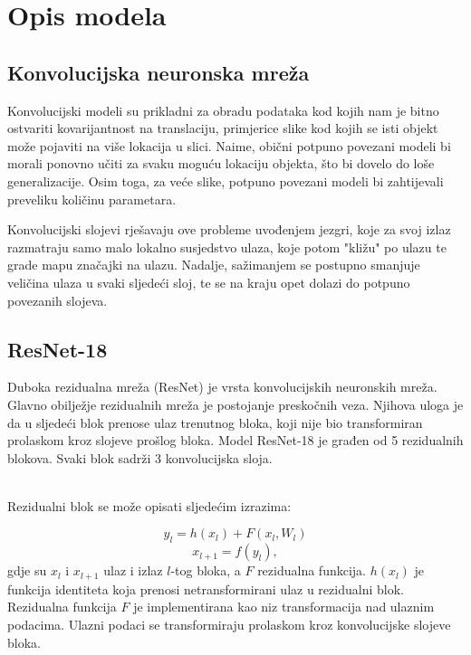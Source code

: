 \chapter{Opis modela}

\section{Konvolucijska neuronska mreža}

Konvolucijski modeli su prikladni za obradu podataka kod kojih nam je bitno ostvariti kovarijantnost na translaciju, primjerice slike kod kojih se isti objekt može pojaviti na više lokacija u slici. Naime, obični potpuno povezani modeli bi morali ponovno učiti za svaku moguću lokaciju objekta, što bi dovelo do loše generalizacije. Osim toga, za veće slike, potpuno povezani modeli bi zahtijevali preveliku količinu parametara.

Konvolucijski slojevi rješavaju ove probleme uvođenjem jezgri, koje za svoj izlaz razmatraju samo malo lokalno susjedstvo ulaza, koje potom "kližu" po ulazu te grade mapu značajki na ulazu. Nadalje, sažimanjem se postupno smanjuje veličina ulaza u svaki sljedeći sloj, te se na kraju opet dolazi do potpuno povezanih slojeva.

\section{ResNet-18}

Duboka rezidualna mreža (ResNet) je vrsta konvolucijskih neuronskih mreža. Glavno obilježje rezidualnih mreža je postojanje preskočnih veza. Njihova uloga je da u sljedeći blok prenose ulaz trenutnog bloka, koji nije bio transformiran prolaskom kroz slojeve prošlog bloka. Model ResNet-18 je građen od 5 rezidualnih blokova. Svaki blok sadrži 3 konvolucijska sloja.

\noindent\\Rezidualni blok se može opisati sljedećim izrazima:

\[y_{l} = h(x_{l}) + F(x_{l}, W_{l})\]
\[x_{l+1} = f(y_{l}),\]
gdje su \(x_{l}\) i \(x_{l+1}\) ulaz i izlaz \(l\)-tog bloka, a \(F\) rezidualna funkcija. \(h(x_{l})\) je funkcija identiteta koja prenosi netransformirani ulaz u rezidualni blok. Rezidualna funkcija \(F\) je implementirana kao niz transformacija nad ulaznim podacima. Ulazni podaci se transformiraju prolaskom kroz konvolucijske slojeve bloka.